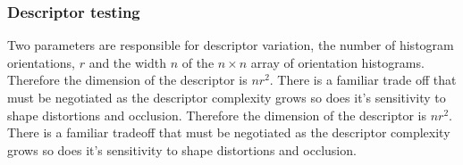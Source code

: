 \documentclass{article}
\begin{document}
%	


\subsubsection{Descriptor testing}\label{SSS:DT}
Two parameters are responsible for descriptor variation, the number of histogram orientations, $r$ and the width $n$ of the $n\times n$ array of orientation histograms.  
Therefore the dimension of the descriptor is $nr^2$.  
There is a familiar trade off that must be negotiated as the descriptor complexity grows so does it's sensitivity to shape distortions and occlusion.  
Therefore the dimension of the descriptor is $nr^2$.  
There is a familiar tradeoff that must be negotiated as the descriptor complexity grows so does it's sensitivity to shape distortions and occlusion.  
\end{document}
